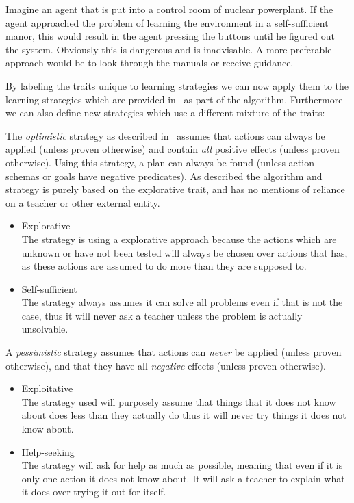 \documentclass[\master/Master.tex]{subfiles}
\begin{document}
    \begin{example}
    	Imagine an agent that is put into a control room of nuclear powerplant.
    	 If the agent approached the problem of learning the environment in a self-sufficient manor, 
    	 this would result in the agent pressing the buttons until he figured out the system.
    	 Obviously this is dangerous and is inadvisable. 
    	 A more preferable approach would be to look through the manuals or receive guidance.
    \end{example}
	By labeling the traits unique to learning strategies we can now apply them to the learning strategies which are provided in~\cite{Walsh2008} as part of the algorithm. Furthermore we can also define new strategies which use a different mixture of the traits:
    \begin{example}
		[{Optimisic}] The \emph{optimistic} strategy as described in~\cite{Walsh2008} assumes that actions
	    can always be applied (unless proven otherwise) and contain \emph{all}
	    positive effects (unless proven otherwise). Using this strategy, a
	    plan can always be found (unless action schemas or goals have negative
	    predicates). As described the algorithm and strategy is purely based on the explorative trait, and has no mentions of reliance on a teacher or other external entity.
	    \begin{itemize}
	    \item Explorative\\
	    The strategy is using a explorative approach because the actions
	    which are unknown or have not been tested will always be chosen over
	    actions that has, as these actions are assumed to do more than they
	    are supposed to.
	    \item Self-sufficient\\
	    The strategy always assumes it can solve all problems even if that
	    is not the case, thus it will never ask a teacher unless the problem
	    is actually unsolvable.
	    \end{itemize}
	\end{example}
    \begin{example}
    [{Pessimistic}] A \emph{pessimistic} strategy assumes that actions
    can \emph{never} be applied (unless proven otherwise), and that they
    have all \emph{negative} effects (unless proven otherwise).
    \begin{itemize}
    \item Exploitative\\
    The strategy used will purposely assume that things that it does not
    know about does less than they actually do thus it will never try
    things it does not know about.
    \item Help-seeking\\
    The strategy will ask for help as much as possible, meaning that even
    if it is only one action it does not know about. It will ask a teacher
    to explain what it does over trying it out for itself.
    \end{itemize}
    \end{example}
\end{document}
